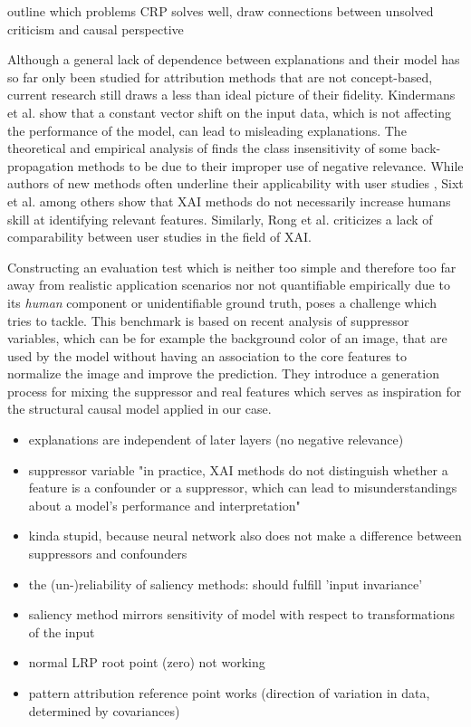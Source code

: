 {\color{red} outline which problems CRP solves well, draw connections between unsolved criticism and causal perspective}

Although a general lack of dependence between explanations and their model \cite{Adebayo2018,Karimi2023} has so far only been studied for attribution methods that are not concept-based, current research still draws a less than ideal picture of their fidelity.
Kindermans et al. \cite{Kindermans2019} show that a constant vector shift on the input data, which is not affecting the performance of the model, can lead to misleading explanations. The theoretical and empirical analysis of \cite{Sixt2020} finds the class insensitivity of some back-propagation methods to be due to their improper use of negative relevance.
While authors of new methods often underline their applicability with user studies \cite{Achtibat2023,Fel2023,Ghorbani2019,Zhang2021}, Sixt et al. \cite{Sixt2022a} among others \cite{Singla2022} show that XAI methods do not necessarily increase humans skill at identifying relevant features. Similarly, Rong et al. \cite{Rong2023} criticizes a lack of comparability between user studies in the field of XAI. 

Constructing an evaluation test which is neither too simple and therefore too far away from realistic application scenarios nor not quantifiable empirically due to its \textit{human} component or unidentifiable ground truth, poses a challenge which \cite{Clark2023} tries to tackle. This benchmark is based on recent analysis \cite{Wilming2023} of suppressor variables, which can be for example the background color of an image, that are used by the model without having an association to the core features to normalize the image and improve the prediction.
They introduce a generation process for mixing the suppressor and real features which serves as inspiration for the structural causal model applied in our case.

\begin{itemize}
      \item explanations are independent of later layers (no negative relevance) \cite{Sixt2020}
      \item suppressor variable "in practice, XAI methods do not distinguish whether a feature is a confounder or a suppressor, which can lead to misunderstandings about a model's performance and interpretation"
      \item kinda stupid, because neural network also does not make a difference between suppressors and confounders \cite{Wilming2023}
      \item the (un-)reliability of saliency methods: should fulfill 'input invariance'
      \item saliency method mirrors sensitivity of model with respect to transformations of the input
      \item normal LRP root point (zero) not working
      \item pattern attribution reference point works (direction of variation in data, determined by covariances) \cite{Kindermans2019}
\end{itemize}


